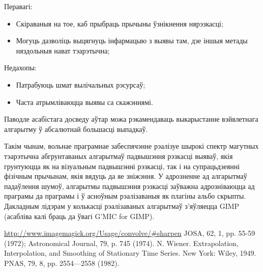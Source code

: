 \documentclass[10pt, a5paper]{article}
\begin{document}
Перавагі:

\begin{itemize}
  \item Скіраваныя на тое, каб прыбраць прычыны ўзнікнення нярэзкасці;
  \item Могуць дазволіць выцягнуць інфармацыю з выявы там, дзе іншыя метады няздольныя нават тэарэтычна;
\end{itemize}

Недахопы:

\begin{itemize}
  \item Патрабуюць шмат вылічальных рэсурсаў;
  \item Часта атрымліваюцца выявы са скажэннямі.
\end{itemize}

Паводле асабістага досведу аўтар можа рэкамендаваць выкарыстанне вэйвлетнага алгарытму ў абсалютнай большасці выпадкаў.

Такім чынам, вольнае праграмнае забеспячэнне рэалізуе шырокі спектр магутных тэарэтычна абгрунтаваных алгарытмаў падвышэння рэзкасці выяваў, якія грунтуюцца як на візуальным падвышэнні рэзкасці, так і на супрацьдзеянні фізічным прычынам, якія вядуць да яе зніжэння. У адрозненне ад алгарытмаў падаўлення шумоў, алгарытмы падвышэння рэзкасці заўважна адрозніваюцца ад праграмы да праграмы і ў асноўным рэалізаваныя як плагіны альбо скрыпты. Дакладным лідэрам у колькасці рэалізаваных алгарытмаў з’яўляецца {GIMP} (асабліва калі браць да ўвагі {G'MIC} for {GIMP}).

\begin{thebibliography}{9}
 \url{http://www.imagemagick.org/Usage/convolve/#sharpen}
 JOSA, 62, 1, pp. 55-59 (1972); Astronomical Journal, 79, p. 745 (1974).
 N. Wiener. Extrapolation, Interpolation, and Smoothing of Stationary Time Series. New York: Wiley, 1949.
 PNAS, 79, 8, pp. 2554—2558 (1982).
\end{thebibliography}
\end{document}
